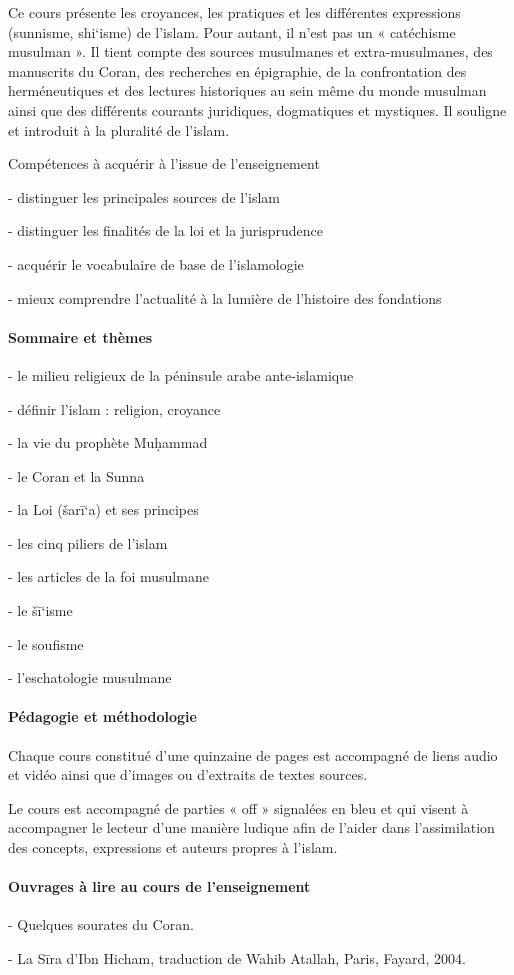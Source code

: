 


Ce cours présente les croyances, les pratiques et les différentes
expressions (sunnisme, shi`isme) de l'islam. Pour autant, il n'est pas
un « catéchisme musulman ». Il tient compte des sources musulmanes et
extra-musulmanes, des manuscrits du Coran, des recherches en épigraphie,
de la confrontation des herméneutiques et des lectures historiques au
sein même du monde musulman ainsi que des différents courants
juridiques, dogmatiques et mystiques. Il souligne et introduit à la
pluralité de l'islam.

Compétences à acquérir à l'issue de l'enseignement

- distinguer les principales sources de l'islam

- distinguer les finalités de la loi et la jurisprudence

- acquérir le vocabulaire de base de l'islamologie

- mieux comprendre l'actualité à la lumière de l'histoire des fondations

\paragraph{Sommaire et thèmes}

- le milieu religieux de la péninsule arabe ante-islamique

- définir l'islam : religion, croyance

- la vie du prophète Muḥammad

- le Coran et la Sunna

- la Loi (šarī`a) et ses principes

- les cinq piliers de l'islam

- les articles de la foi musulmane

- le šī`isme

- le soufisme

- l'eschatologie musulmane

\paragraph{Pédagogie et méthodologie}

Chaque cours constitué d'une quinzaine de pages est accompagné de liens
audio et vidéo ainsi que d'images ou d'extraits de textes sources.

Le cours est accompagné de parties « off » signalées en bleu et qui
visent à accompagner le lecteur d'une manière ludique afin de l'aider
dans l'assimilation des concepts, expressions et auteurs propres à
l'islam.

\paragraph{Ouvrages à lire au cours de l'enseignement}

- Quelques sourates du Coran.

- La Sīra d'Ibn Hicham, traduction de Wahib Atallah, Paris, Fayard,
2004.